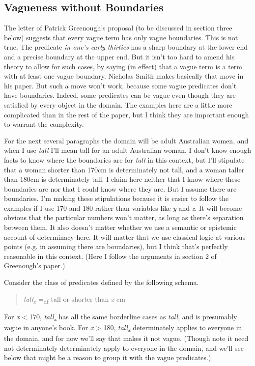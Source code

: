 \subsection{Vagueness without Boundaries}

The letter of Patrick Greenough's proposal (to be discussed in section three below) suggests that every vague term has only vague boundaries. This is not true. The predicate \textit{in one's early thirties} has a sharp boundary at the lower end and a precise boundary at the upper end. But it isn't too hard to amend his theory to allow for such cases, by saying (in effect) that a vague term is a term with at least one vague boundary. Nicholas Smith makes basically that move in his paper. But such a move won't work, because some vague predicates don't have boundaries. Indeed, some predicates can be vague even though they are satisfied by every object in the domain. The examples here are a little more complicated than in the rest of the paper, but I think they are important enough to warrant the complexity.

For the next several paragraphs the domain will be adult Australian women, and when I use \textit{tall} I'll mean tall for an adult Australian woman. I don't know enough facts to know where the boundaries are for \textit{tall} in this context, but I'll stipulate that a woman shorter than 170cm is determinately not tall, and a woman taller than 180cm is determinately tall. I claim here neither that I know where these boundaries are nor that I could know where they are. But I assume there are boundaries. I'm making these stipulations because it is easier to follow the examples if I use 170 and 180 rather than variables like \textit{y} and \textit{z}. It will become obvious that the particular numbers won't matter, as long as there's separation between them. It also doesn't matter whether we use a semantic or epistemic account of determinacy here. It will matter that we use classical logic at various points (e.g. in assuming there are boundaries), but I think that's perfectly reasonable in this context. (Here I follow the arguments in section 2 of Greenough's paper.)

Consider the class of predicates defined by the following schema.

\begin{quote}
\textit{tall}\textit{\textsubscript{x}} =\textsubscript{df} tall or shorter than \textit{x} cm
\end{quote}

\noindent For \textit{x} {\textless} 170, \textit{tall}\textit{\textsubscript{x}} has all the same borderline cases as \textit{tall}, and is presumably vague in anyone's book. For \textit{x} {\textgreater} 180, \textit{tall}\textit{\textsubscript{x}} determinately applies to everyone in the domain, and for now we'll say that makes it not vague. (Though note it need not determinately determinately apply to everyone in the domain, and we'll see below that might be a reason to group it with the vague predicates.) 

